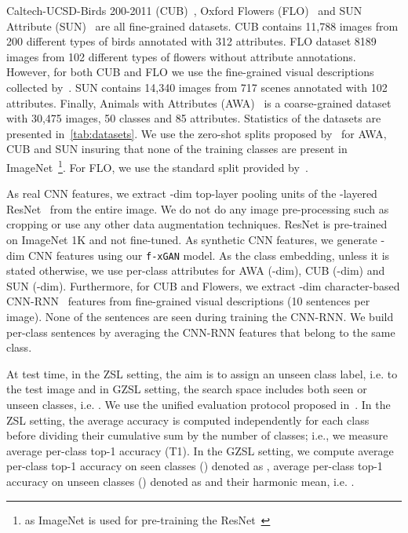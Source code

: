 \documentclass[10pt,twocolumn,letterpaper]{article}
\newcommand{\myparagraph}[1]{\vspace{6pt}\noindent{\bf #1}}
\def\mthd{\texttt{f-xGAN}\xspace}
\begin{document}
\myparagraph{Datasets.} Caltech-UCSD-Birds 200-2011 (CUB)~\cite{CaltechUCSDBirdsDataset}, Oxford Flowers (FLO)~\cite{OxfordFlowersDataset} and SUN Attribute (SUN)~\cite{PH12} are all fine-grained datasets. CUB contains 11,788 images from 200 different types of birds annotated with 312 attributes. FLO dataset 8189 images from 102 different types of flowers without attribute annotations. However, for both CUB and FLO we use the fine-grained visual descriptions collected by~\cite{RALS16}. SUN contains 14,340 images from 717 scenes annotated with 102 attributes. Finally,  Animals with Attributes (AWA)~\cite{LNH13} is a coarse-grained dataset with 30,475 images, 50 classes and 85 attributes. Statistics of the datasets are presented in~\autoref{tab:datasets}. We use the zero-shot splits proposed by~\cite{XSA17} for AWA, CUB and SUN insuring that none of the training classes are present in ImageNet~\cite{ImageNet}\footnote{as ImageNet is used for pre-training the ResNet~\cite{HZRS15}}. For FLO, we use the standard split provided by~\cite{RALS16}. 

\myparagraph{Features.}
As real CNN features, we extract -dim top-layer pooling units of the -layered ResNet~\cite{HZRS15} from the entire image. We do not do any image pre-processing such as cropping or use any other data augmentation techniques. ResNet is pre-trained on ImageNet 1K and not fine-tuned. As synthetic CNN features, we generate -dim CNN features using our \mthd model. As the class embedding, unless it is stated otherwise, we use per-class attributes for AWA (-dim), CUB (-dim) and SUN (-dim). 
Furthermore, for CUB and Flowers, we extract -dim character-based CNN-RNN~\cite{RALS16} features from fine-grained visual descriptions (10 sentences per image). None of the  sentences are seen during training the CNN-RNN.
We build per-class sentences by averaging the CNN-RNN features that belong to the same class. 


\myparagraph{Evaluation Protocol.}
At test time, in the ZSL setting, the aim is to assign an unseen class label, i.e.  to the test image and in GZSL setting, the search space includes both seen or unseen classes, i.e. .
We use the unified evaluation protocol proposed in~\cite{XSA17}.
In the ZSL setting, the average accuracy is computed independently for each class before dividing their cumulative sum by the number of classes;
i.e., we measure average per-class top-1 accuracy (T1).
In the GZSL setting, we compute average per-class top-1 accuracy on seen classes () denoted as , average per-class top-1 accuracy on unseen classes () denoted as  and their harmonic mean, i.e. 
.
\end{document}
